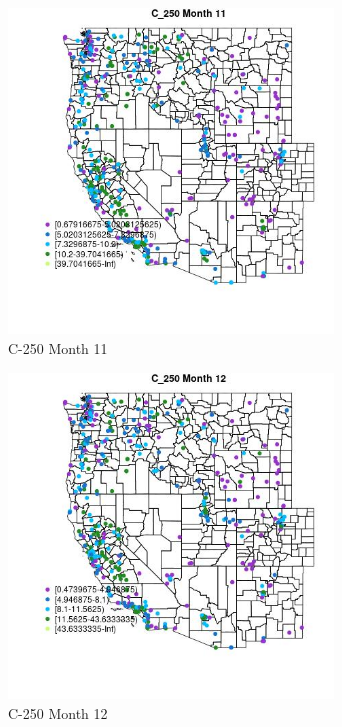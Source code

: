\begin{figure} 
\centering  
\includegraphics[width=0.77\textwidth]{Code_Outputs/ML_input_report_ML_input_PM25_Step5_part_d_de_duplicated_aves_ML_input_MapObsMo11C_250.jpg} 
\caption{\label{fig:ML_input_report_ML_input_PM25_Step5_part_d_de_duplicated_aves_ML_inputMapObsMo11C_250}C-250 Month 11} 
\end{figure} 
 

\begin{figure} 
\centering  
\includegraphics[width=0.77\textwidth]{Code_Outputs/ML_input_report_ML_input_PM25_Step5_part_d_de_duplicated_aves_ML_input_MapObsMo12C_250.jpg} 
\caption{\label{fig:ML_input_report_ML_input_PM25_Step5_part_d_de_duplicated_aves_ML_inputMapObsMo12C_250}C-250 Month 12} 
\end{figure} 
 

